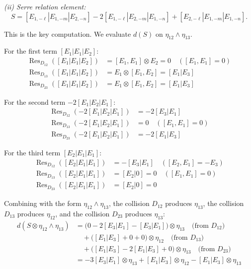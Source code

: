 \begin{computation}
\emph{(ii) Serre relation element:}
\[
S = [E_{1,-\ell}|E_{1,-m}|E_{2,-n}] -
2[E_{1,-\ell}|E_{2,-m}|E_{1,-n}] + [E_{2,-\ell}|E_{1,-m}|E_{1,-n}].
\]

This is the key computation.  We evaluate $d(S)$ on $\eta_{12}\wedge\eta_{13}$.

For the first term $[E_1|E_1|E_2]$:
\begin{align*}
\operatorname{Res}_{D_{12}}([E_1|E_1|E_2]) &= [E_1, E_1] \otimes E_2
= 0 \quad ([E_1, E_1] = 0) \\
\operatorname{Res}_{D_{13}}([E_1|E_1|E_2]) &= E_1 \otimes [E_1, E_2]
= [E_1|E_3] \\
\operatorname{Res}_{D_{23}}([E_1|E_1|E_2]) &= E_1 \otimes [E_1, E_2]
= [E_1|E_3]
\end{align*}

For the second term $-2[E_1|E_2|E_1]$:
\begin{align*}
\operatorname{Res}_{D_{12}}(-2[E_1|E_2|E_1]) &= -2[E_3|E_1] \\
\operatorname{Res}_{D_{13}}(-2[E_1|E_2|E_1]) &= 0
\quad ([E_1, E_1] = 0) \\
\operatorname{Res}_{D_{23}}(-2[E_1|E_2|E_1]) &= -2[E_1|E_3]
\end{align*}

For the third term $[E_2|E_1|E_1]$:
\begin{align*}
\operatorname{Res}_{D_{12}}([E_2|E_1|E_1]) &= -[E_3|E_1]
\quad ([E_2, E_1] = -E_3) \\
\operatorname{Res}_{D_{13}}([E_2|E_1|E_1]) &= [E_2|0] = 0
\quad ([E_1, E_1] = 0) \\
\operatorname{Res}_{D_{23}}([E_2|E_1|E_1]) &= [E_2|0] = 0
\end{align*}

Combining with the form $\eta_{12}\wedge\eta_{13}$,
the collision $D_{12}$ produces $\eta_{13}$,
the collision $D_{13}$ produces $\eta_{12}$,
and the collision $D_{23}$ produces $\eta_{13}$:
\begin{align*}
d(S \otimes \eta_{12}\wedge\eta_{13})
&= \bigl(0 - 2[E_3|E_1] - [E_3|E_1]\bigr) \otimes \eta_{13}
\quad\text{(from $D_{12}$)} \\
&\quad + \bigl([E_1|E_3] + 0 + 0\bigr) \otimes \eta_{12}
\quad\text{(from $D_{13}$)} \\
&\quad + \bigl([E_1|E_3] - 2[E_1|E_3] + 0\bigr) \otimes \eta_{13}
\quad\text{(from $D_{23}$)} \\
&= -3[E_3|E_1]\otimes\eta_{13}
+ [E_1|E_3]\otimes\eta_{12}
- [E_1|E_3]\otimes\eta_{13}
\end{align*}


\end{computation}
